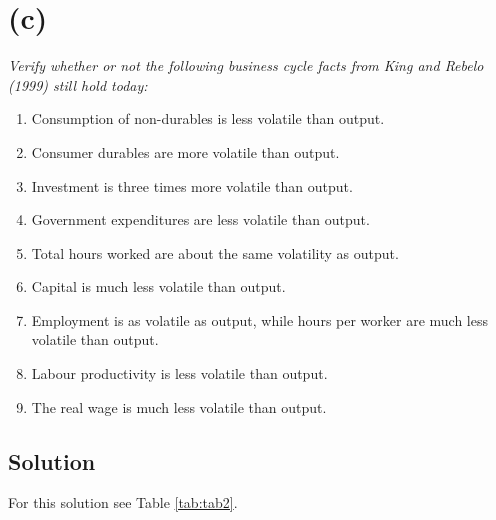 \documentclass[a4paper,10pt]{report}
\begin{document}
\section*{(c)}
\textit{Verify whether or not the following business cycle facts from King and Rebelo (1999) still hold today:}


\begin{enumerate}
  \item Consumption of non-durables is less volatile than output.
  \item Consumer durables are more volatile than output.
  \item Investment is three times more volatile than output.
  \item Government expenditures are less volatile than output.
  \item Total hours worked are about the same volatility as output.
  \item Capital is much less volatile than output.
  \item Employment is as volatile as output, while hours per worker are much less volatile than output.
  \item Labour productivity is less volatile than output.
  \item The real wage is much less volatile than output.
\end{enumerate}



\subsection*{Solution}
For this solution see Table \ref{tab:tab2}.
\end{document}
